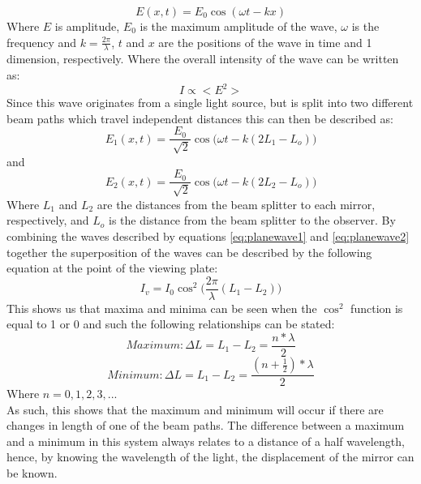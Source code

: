 \documentclass[12pt,a4paper,oneside]{report}
\begin{document}
\begin{equation}
E(x,t) = E_{0}\cos{(\omega t - kx)}
	\label{eq:planewave}
\end{equation}
Where $E$ is amplitude, $E_{0}$ is the maximum amplitude of the wave, $\omega$ is the frequency and $k = \frac{2\pi}{\lambda}$, $t$ and $x$ are the positions of the wave in time and 1 dimension, respectively.
Where the overall intensity of the wave can be written as:
\begin{equation}
I \propto <E^{2}>
	\label{eq:intensitypw}
\end{equation}
Since this wave originates from a single light source, but is split into two different beam paths which travel independent distances this can then be described as:
\begin{equation}
E_{1}(x,t) = \frac{E_{0}}{\sqrt[]{2}}\cos{\Big(\omega t - k(2L_{1} - L_{o})\Big)}
	\label{eq:planewave1}
\end{equation}
and
\begin{equation}
E_{2}(x,t) = \frac{E_{0}}{\sqrt[]{2}}\cos{\Big(\omega t - k(2L_{2} - L_{o})\Big)}
	\label{eq:planewave2}
\end{equation}
Where $L_{1}$ and $L_{2}$ are the distances from the beam splitter to each mirror, respectively, and $L_{o}$ is the distance from the beam splitter to the observer.
By combining the waves described by equations \ref{eq:planewave1} and \ref{eq:planewave2} together the superposition of the waves can be described by the following equation at the point of the viewing plate:
\begin{equation}
I_{v} = I_{0} \cos^{2}{\Big(\frac{2\pi}{\lambda}(L_{1} - L_{2})\Big)}
	\label{eq:finalwave}
\end{equation}
This shows us that maxima and minima can be seen when the $\cos^{2}$ function is equal to 1 or 0 and such the following relationships can be stated:
\begin{equation}
Maximum: \Delta L = L_{1} - L_{2} = \frac{n*\lambda}{2}
	\label{eq:fringesmax}
\end{equation}
\begin{equation}
Minimum: \Delta L = L_{1} - L_{2} = \frac{(n+\frac{1}{2})*\lambda}{2}
	\label{eq:fringesmin}
\end{equation}
Where $n = 0, 1, 2, 3, ...$ \\
As such, this shows that the maximum and minimum will occur if there are changes in length of one of the beam paths. The difference between a maximum and a minimum in this system always relates to a distance of a half wavelength, hence, by knowing the wavelength of the light, the displacement of the mirror can be known.\\
\end{document}
